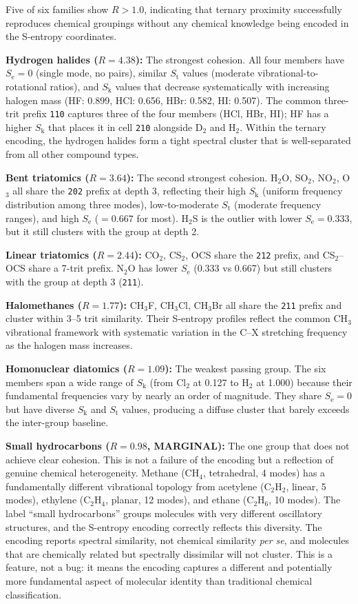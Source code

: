 \documentclass[11pt,a4paper]{article}
\theoremstyle{definition}
\theoremstyle{remark}
\newcommand{\Sk}{S_{\mathrm{k}}}
\newcommand{\St}{S_{\mathrm{t}}}
\newcommand{\Se}{S_{\mathrm{e}}}
\begin{document}
Five of six families show $R > 1.0$, indicating that ternary proximity successfully reproduces chemical groupings without any chemical knowledge being encoded in the S-entropy coordinates.

\textbf{Hydrogen halides ($R = 4.38$):} The strongest cohesion. All four members have $\Se = 0$ (single mode, no pairs), similar $\St$ values (moderate vibrational-to-rotational ratios), and $\Sk$ values that decrease systematically with increasing halogen mass (HF: 0.899, HCl: 0.656, HBr: 0.582, HI: 0.507). The common three-trit prefix \texttt{110} captures three of the four members (HCl, HBr, HI); HF has a higher $\Sk$ that places it in cell \texttt{210} alongside D$_2$ and H$_2$. Within the ternary encoding, the hydrogen halides form a tight spectral cluster that is well-separated from all other compound types.

\textbf{Bent triatomics ($R = 3.64$):} The second strongest cohesion. H$_2$O, SO$_2$, NO$_2$, O$_3$ all share the \texttt{202} prefix at depth 3, reflecting their high $\Sk$ (uniform frequency distribution among three modes), low-to-moderate $\St$ (moderate frequency ranges), and high $\Se$ ($= 0.667$ for most). H$_2$S is the outlier with lower $\Se = 0.333$, but it still clusters with the group at depth 2.

\textbf{Linear triatomics ($R = 2.44$):} CO$_2$, CS$_2$, OCS share the \texttt{212} prefix, and CS$_2$--OCS share a 7-trit prefix. N$_2$O has lower $\Se$ (0.333 vs 0.667) but still clusters with the group at depth 3 (\texttt{211}).

\textbf{Halomethanes ($R = 1.77$):} CH$_3$F, CH$_3$Cl, CH$_3$Br all share the \texttt{211} prefix and cluster within 3--5 trit similarity. Their S-entropy profiles reflect the common CH$_3$ vibrational framework with systematic variation in the C--X stretching frequency as the halogen mass increases.

\textbf{Homonuclear diatomics ($R = 1.09$):} The weakest passing group. The six members span a wide range of $\Sk$ (from Cl$_2$ at 0.127 to H$_2$ at 1.000) because their fundamental frequencies vary by nearly an order of magnitude. They share $\Se = 0$ but have diverse $\Sk$ and $\St$ values, producing a diffuse cluster that barely exceeds the inter-group baseline.

\textbf{Small hydrocarbons ($R = 0.98$, MARGINAL):} The one group that does not achieve clear cohesion. This is not a failure of the encoding but a reflection of genuine chemical heterogeneity. Methane (CH$_4$, tetrahedral, 4 modes) has a fundamentally different vibrational topology from acetylene (C$_2$H$_2$, linear, 5 modes), ethylene (C$_2$H$_4$, planar, 12 modes), and ethane (C$_2$H$_6$, 10 modes). The label ``small hydrocarbons'' groups molecules with very different oscillatory structures, and the S-entropy encoding correctly reflects this diversity. The encoding reports spectral similarity, not chemical similarity \emph{per se}, and molecules that are chemically related but spectrally dissimilar will not cluster. This is a feature, not a bug: it means the encoding captures a different and potentially more fundamental aspect of molecular identity than traditional chemical classification.
\end{document}
